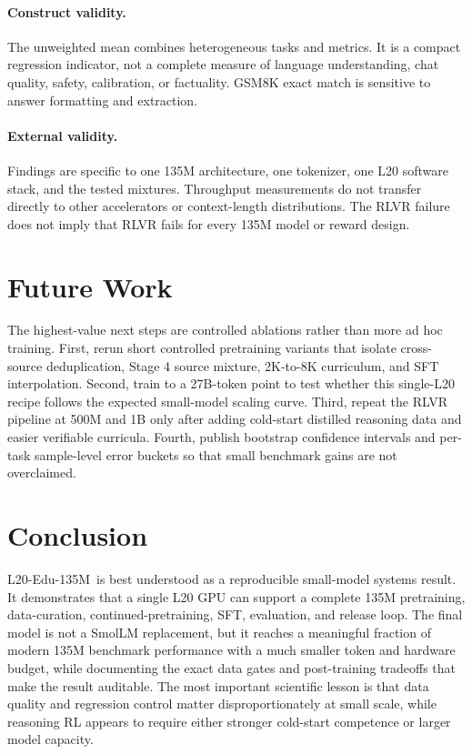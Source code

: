 \documentclass[11pt]{article}
\newcommand{\model}{L20-Edu-135M}
\begin{document}
\paragraph{Construct validity.}
The unweighted mean combines heterogeneous tasks and metrics. It is a compact regression indicator, not a complete measure of language understanding, chat quality, safety, calibration, or factuality. GSM8K exact match is sensitive to answer formatting and extraction.

\paragraph{External validity.}
Findings are specific to one 135M architecture, one tokenizer, one L20 software stack, and the tested mixtures. Throughput measurements do not transfer directly to other accelerators or context-length distributions. The RLVR failure does not imply that RLVR fails for every 135M model or reward design.

\section{Future Work}

The highest-value next steps are controlled ablations rather than more ad hoc training. First, rerun short controlled pretraining variants that isolate cross-source deduplication, Stage 4 source mixture, 2K-to-8K curriculum, and SFT interpolation. Second, train to a 27B-token point to test whether this single-L20 recipe follows the expected small-model scaling curve. Third, repeat the RLVR pipeline at 500M and 1B only after adding cold-start distilled reasoning data and easier verifiable curricula. Fourth, publish bootstrap confidence intervals and per-task sample-level error buckets so that small benchmark gains are not overclaimed.

\section{Conclusion}

\model\ is best understood as a reproducible small-model systems result. It demonstrates that a single L20 GPU can support a complete 135M pretraining, data-curation, continued-pretraining, SFT, evaluation, and release loop. The final model is not a SmolLM replacement, but it reaches a meaningful fraction of modern 135M benchmark performance with a much smaller token and hardware budget, while documenting the exact data gates and post-training tradeoffs that make the result auditable. The most important scientific lesson is that data quality and regression control matter disproportionately at small scale, while reasoning RL appears to require either stronger cold-start competence or larger model capacity.
\end{document}
